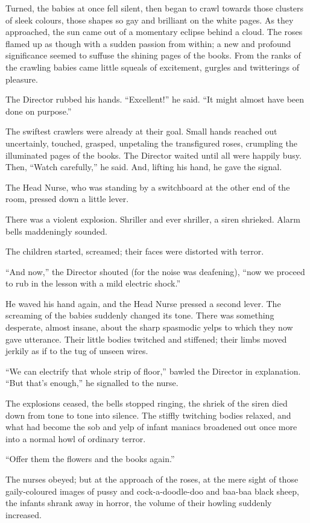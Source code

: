 \documentclass[12pt]{report}
\begin{document}
Turned, the babies at once fell silent, then began to crawl towards
those clusters of sleek colours, those shapes so gay and brilliant on
the white pages. As they approached, the sun came out of a momentary
eclipse behind a cloud. The roses flamed up as though with a sudden
passion from within; a new and profound significance seemed to suffuse
the shining pages of the books. From the ranks of the crawling babies
came little squeals of excitement, gurgles and twitterings of pleasure.

The Director rubbed his hands. ``Excellent!'' he said. ``It might almost
have been done on purpose.''

The swiftest crawlers were already at their goal. Small hands reached
out uncertainly, touched, grasped, unpetaling the transfigured roses,
crumpling the illuminated pages of the books. The Director waited until
all were happily busy. Then, ``Watch carefully,'' he said. And, lifting
his hand, he gave the signal.

The Head Nurse, who was standing by a switchboard at the other end of
the room, pressed down a little lever.

There was a violent explosion. Shriller and ever shriller, a siren
shrieked. Alarm bells maddeningly sounded.

The children started, screamed; their faces were distorted with terror.

``And now,'' the Director shouted (for the noise was deafening), ``now
we proceed to rub in the lesson with a mild electric shock.''

He waved his hand again, and the Head Nurse pressed a second lever. The
screaming of the babies suddenly changed its tone. There was something
desperate, almost insane, about the sharp spasmodic yelps to which they
now gave utterance. Their little bodies twitched and stiffened; their
limbs moved jerkily as if to the tug of unseen wires.

``We can electrify that whole strip of floor,'' bawled the Director in
explanation. ``But that's enough,'' he signalled to the nurse.

The explosions ceased, the bells stopped ringing, the shriek of the
siren died down from tone to tone into silence. The stiffly twitching
bodies relaxed, and what had become the sob and yelp of infant maniacs
broadened out once more into a normal howl of ordinary terror.

``Offer them the flowers and the books again.''

The nurses obeyed; but at the approach of the roses, at the mere sight
of those gaily-coloured images of pussy and cock-a-doodle-doo and
baa-baa black sheep, the infants shrank away in horror, the volume of
their howling suddenly increased.
\end{document}
